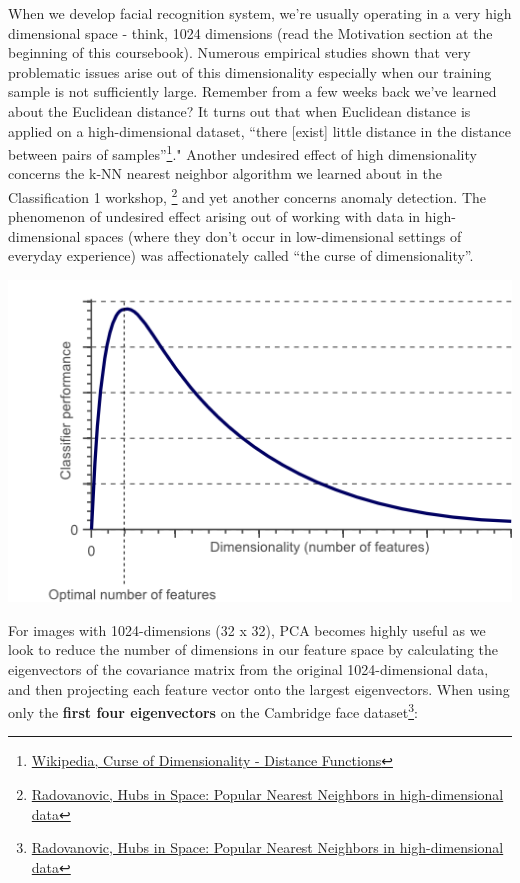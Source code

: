 \documentclass[]{article}
\let\rmarkdownfootnote\footnote%
\def\footnote{\protect\rmarkdownfootnote}
\begin{document}
When we develop facial recognition system, we're usually operating in a
very high dimensional space - think, 1024 dimensions (read the
Motivation section at the beginning of this coursebook). Numerous
empirical studies shown that very problematic issues arise out of this
dimensionality especially when our training sample is not sufficiently
large. Remember from a few weeks back we've learned about the Euclidean
distance? It turns out that when Euclidean distance is applied on a
high-dimensional dataset, ``there {[}exist{]} little distance in the
distance between pairs of samples''\footnote{\href{https://en.wikipedia.org/wiki/Curse_of_dimensionality\#Distance_functions}{Wikipedia,
  Curse of Dimensionality - Distance Functions}}." Another undesired
effect of high dimensionality concerns the k-NN nearest neighbor
algorithm we learned about in the Classification 1 workshop, \footnote{\href{http://www.jmlr.org/papers/volume11/radovanovic10a/radovanovic10a.pdf}{Radovanovic,
  Hubs in Space: Popular Nearest Neighbors in high-dimensional data}}
and yet another concerns anomaly detection. The phenomenon of undesired
effect arising out of working with data in high-dimensional spaces
(where they don't occur in low-dimensional settings of everyday
experience) was affectionately called ``the curse of dimensionality''.

\includegraphics{assets/curseofdim.png}

For images with 1024-dimensions (32 x 32), PCA becomes highly useful as
we look to reduce the number of dimensions in our feature space by
calculating the eigenvectors of the covariance matrix from the original
1024-dimensional data, and then projecting each feature vector onto the
largest eigenvectors. When using only the \textbf{first four
eigenvectors} on the Cambridge face dataset\footnote{\href{http://www.jmlr.org/papers/volume11/radovanovic10a/radovanovic10a.pdf}{Radovanovic,
  Hubs in Space: Popular Nearest Neighbors in high-dimensional data}}:
\end{document}
